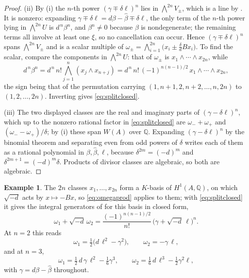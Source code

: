 \documentclass[11pt,reqno]{amsart}
\theoremstyle{plain}
\theoremstyle{definition}
\newtheorem{example}[theorem]{Example}
\theoremstyle{remark}
\newcommand{\QQ}{\mathbb{Q}}
\newcommand{\HW}{W}                      %
\begin{document}
\begin{proof}
(ii) By (i) the $n$-th power $(\gamma\mp\delta\ell)^{n}$ lies in
$\bigwedge^{2n}V_{\pm}$, which is a line by . It is
nonzero: expanding $\gamma\mp\delta\ell=d\beta-\widehat{\beta}\mp\delta\ell$,
the only term of the $n$-th power lying in $\bigwedge^{2n}U$ is
$d^{\,n}\beta^{n}$, and $\beta^{n}\ne0$ because $\beta$ is nondegenerate;
the remaining terms all involve at least one $\xi$, so no cancellation can
occur. Hence $(\gamma\mp\delta\ell)^{n}$ spans $\bigwedge^{2n}V_{\pm}$ and is a
scalar multiple of $\omega_{\pm}=\bigwedge_{i=1}^{2n}\bigl(x_{i}\pm\tfrac{\delta}{d}Bx_{i}\bigr)$.
To find the scalar, compare the components in $\bigwedge^{2n}U$: that of
$\omega_{\pm}$ is $x_{1}\wedge\cdots\wedge x_{2n}$, while
\[
  d^{\,n}\beta^{n}=d^{\,n}\,n!\bigwedge_{j=1}^{n}(x_{j}\wedge x_{n+j})
  =d^{\,n}\,n!\,(-1)^{n(n-1)/2}\,x_{1}\wedge\cdots\wedge x_{2n},
\]
the sign being that of the permutation carrying
$(1,n+1,2,n+2,\dots,n,2n)$ to $(1,2,\dots,2n)$. Inverting gives
\eqref{eq:splitclosed}.

(iii) The two displayed classes are the real and imaginary parts of
$(\gamma-\delta\ell)^{n}$, which up to the nonzero rational factor in
\eqref{eq:splitclosed} are $\omega_{-}+\omega_{+}$ and
$(\omega_{-}-\omega_{+})/\delta$; by (i) these span
$\HW(A)$ over $\QQ$. Expanding $(\gamma-\delta\ell)^{n}$ by the binomial
theorem and separating even from odd powers of $\delta$ writes each of them as
a rational polynomial in $\beta,\widehat{\beta},\ell$, because
$\delta^{2m}=(-d)^{m}$ and $\delta^{2m+1}=(-d)^{m}\delta$. Products of divisor
classes are algebraic, so both are algebraic.
\end{proof}

\begin{example}\label{ex:splitsmall}
The $2n$ classes $x_{1},\dots,x_{2n}$ form a $K$-basis of $H^{1}(A,\QQ)$, on
which $\sqrt{-d}$ acts by $x\mapsto-Bx$, so \eqref{eq:omegaprod} applies to
them; with \eqref{eq:splitclosed} it gives the integral generators of
 for this basis in closed form,
\[
  \omega_{1}+\sqrt{-d}\,\omega_{2}
  =\frac{(-1)^{n(n-1)/2}}{n!}\,\bigl(\gamma+\sqrt{-d}\,\ell\bigr)^{n}.
\]
At $n=2$ this reads
\[
  \omega_{1}=\tfrac12\bigl(d\,\ell^{2}-\gamma^{2}\bigr),
  \qquad
  \omega_{2}=-\gamma\,\ell,
\]
and at $n=3$,
\[
  \omega_{1}=\tfrac12\,d\,\gamma\,\ell^{2}-\tfrac16\gamma^{3},
  \qquad
  \omega_{2}=\tfrac16\,d\,\ell^{3}-\tfrac12\gamma^{2}\ell,
\]
with $\gamma=d\beta-\widehat{\beta}$ throughout.
\end{example}
\end{document}
